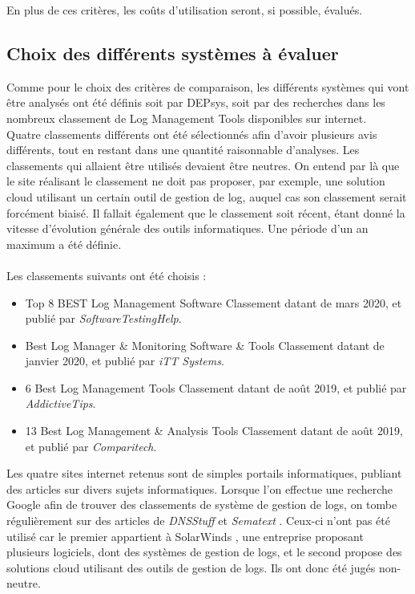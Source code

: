 \documentclass[paper=a4, fontsize=11pt]{scrartcl}
\begin{document}
En plus de ces critères, les coûts d'utilisation seront, si possible, évalués.\\

\subsection{Choix des différents systèmes à évaluer}

Comme pour le choix des critères de comparaison, les différents systèmes qui vont être analysés ont été définis soit par DEPsys, soit par des recherches dans les nombreux classement de \og Log Management Tools \fg disponibles sur internet.\\
Quatre classements différents ont été sélectionnés afin d'avoir plusieurs avis différents, tout en restant dans une quantité raisonnable d'analyses. Les classements qui allaient être utilisés devaient être neutres. On entend par là que le site réalisant le classement ne doit pas proposer, par exemple, une solution cloud utilisant un certain outil de gestion de log, auquel cas son classement serait forcément biaisé. Il fallait également que le classement soit récent, étant donné la vitesse d'évolution générale des outils informatiques. Une période d'un an maximum a été définie.\\\\
Les classements suivants ont été choisis :
\begin{itemize}
    \item Top 8 BEST Log Management Software \cite{noauthor_top_nodate}
    \subitem Classement datant de mars 2020, et publié par \textit{SoftwareTestingHelp}.
    \item Best Log Manager \& Monitoring Software \& Tools \cite{noauthor_best_nodate}
    \subitem Classement datant de janvier 2020, et publié par \textit{iTT Systems}.
    \item 6 Best Log Management Tools \cite{noauthor_6_2019}
    \subitem Classement datant de août 2019, et publié par \textit{AddictiveTips}.
    \item 13 Best Log Management \& Analysis Tools \cite{says_ten_2019}
    \subitem Classement datant de août 2019, et publié par \textit{Comparitech}.
\end{itemize}

Les quatre sites internet retenus sont de simples portails informatiques, publiant des articles sur divers sujets informatiques. Lorsque l'on effectue une recherche Google \cite{noauthor_google_nodate-1} afin de trouver des classements de système de gestion de logs, on tombe régulièrement sur des articles de \textit{DNSStuff} \cite{noauthor_dnsstuff_nodate} et \textit{Sematext} \cite{noauthor_sematext_nodate}. Ceux-ci n'ont pas été utilisé car le premier appartient à SolarWinds \cite{noauthor_logiciels_nodate}, une entreprise proposant plusieurs logiciels, dont des systèmes de gestion de logs, et le second propose des solutions cloud utilisant des outils de gestion de logs. Ils ont donc été jugés non-neutre.
\end{document}
